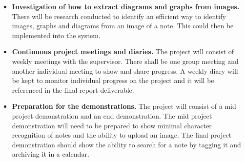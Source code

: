 \documentclass[11pt,fleqn,twoside]{article}
\begin{document}
\begin{itemize}
\item \textbf{Investigation of how to extract diagrams and graphs from images.} There will be research conducted to identify an efficient way to identify images, graphs and diagrams from an image of a note. This could then be implemented into the system.

\item \textbf{Continuous project meetings and diaries.} The project will consist of weekly meetings with the supervisor. There shall be one group meeting and another individual meeting to show and share progress. A weekly diary will be kept to monitor individual progress on the project and it will be referenced in the final report deliverable.

\item \textbf{Preparation for the demonstrations.} The project will consist of a mid project demonstration and an end demonstration. The mid project demonstration will need to be prepared to show minimal character recognition of notes and the ability to upload an image. The final project demonstration should show the ability to search for a note by tagging it and archiving it in a calendar.

\end{itemize}

\end{document}
